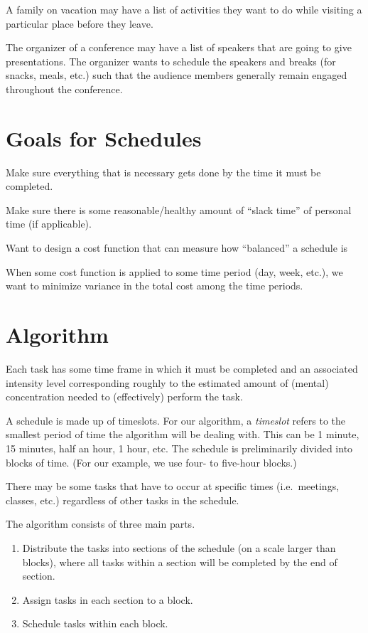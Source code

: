 \documentclass{article}
\begin{document}
A family on vacation may have a list of activities they want to do while visiting a particular place before they leave.

The organizer of a conference may have a list of speakers that are going to give presentations. The organizer wants to schedule the speakers and breaks (for snacks, meals, etc.) such that the audience members generally remain engaged throughout the conference.

\newpage
\section{Goals for Schedules}
Make sure everything that is necessary gets done by the time it must be completed.

Make sure there is some reasonable/healthy amount of ``slack time'' of personal time (if applicable).

Want to design a cost function that can measure how ``balanced'' a schedule is

When some cost function is applied to some time period (day, week, etc.), we want to minimize variance in the total cost among the time periods.



\newpage
\section{Algorithm}
Each task has some time frame in which it must be completed and an associated intensity level corresponding roughly to the estimated amount of (mental) concentration needed to (effectively) perform the task. 

A schedule is made up of timeslots. For our algorithm, a \emph{timeslot} refers to the smallest period of time the algorithm will be dealing with. This can be 1 minute, 15 minutes, half an hour, 1 hour, etc.
The schedule is preliminarily divided into blocks of time.
(For our example, we use four- to five-hour blocks.)

There may be some tasks that have to occur at specific times (i.e.~meetings, classes, etc.) regardless of other tasks in the schedule.

The algorithm consists of three main parts.
\begin{enumerate}
\item Distribute the tasks into sections of the schedule (on a scale larger than blocks), where all tasks within a section will be completed by the end of section.
\item Assign tasks in each section to a block. 
\item Schedule tasks within each block.
\end{enumerate}
\end{document}

